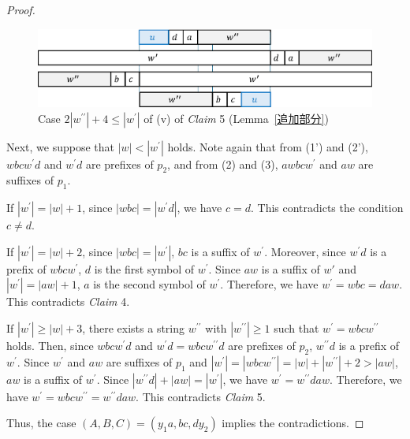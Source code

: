 \begin{proof}
\begin{figure}[t]
  \begin{center}
    \includegraphics[scale=0.45]{figs/w=2w_1+4.eps}
    \caption{Case $2|w^{\prime\prime}| + 4 \leq |w^{\prime}|$ of (v) of \textit{Claim} 5 (Lemma~\ref{追加部分})}\label{2w1+5}
  \end{center}
\end{figure}
    
  Next, we suppose that $|w| < |w^{\prime}|$ holds.
  Note again that from (1') and (2'), $wbcw^{\prime}d$ and $w^{\prime}d$ are prefixes of $p_{2}$, and from (2) and (3), $awbcw^{\prime}$ and $aw$ are suffixes of $p_{1}$.
  
  If $|w^{\prime}|=|w|+1$, since $|wbc|=|w^{\prime}d|$, we have $c=d$. This contradicts the condition $c \ne d$.
  
  If $|w^{\prime}|=|w|+2$, since $|wbc|=|w^{\prime}|$, $bc$ is a suffix of $w^{\prime}$.
  Moreover, since $w^{\prime}d$ is a prefix of $wbcw^{\prime}$, $d$ is the first symbol of $w^{\prime}$.
  Since $aw$ is a suffix of $w'$ and $|w^{\prime}|=|aw|+1$, $a$ is the second symbol of $w^{\prime}$.
  Therefore, we have $w^{\prime}=wbc=daw$.
  This contradicts \textit{Claim} 4.
  
  If $|w^{\prime}| \ge |w|+3$, there exists a string $w^{\prime\prime}$ with $|w^{\prime\prime}| \geq 1$ such that $w^{\prime} = wbcw^{\prime\prime}$ holds.
  Then, since $wbcw^{\prime}d$ and $w^{\prime}d=wbcw^{\prime\prime}d$ are prefixes of $p_{2}$, $w^{\prime\prime}d$ is a prefix of $w^{\prime}$.
  Since $w^{\prime}$ and $aw$ are suffixes of $p_{1}$ and $|w^{\prime}|=|wbcw^{\prime\prime}|=|w|+|w^{\prime\prime}|+2 > |aw|$, $aw$ is a suffix of $w^{\prime}$.
  Since $|w^{\prime\prime}d| + |aw| = |w^{\prime}|$, we have $w^{\prime} = w^{\prime\prime}daw$.
  Therefore, we have $w^{\prime}=wbcw^{\prime\prime}=w^{\prime\prime}daw$.
  This contradicts \textit{Claim} 5.

  Thus, the case $(A, B, C) = (y_{1}a, bc, dy_{2})$ implies the contradictions.
  

\end{proof}
